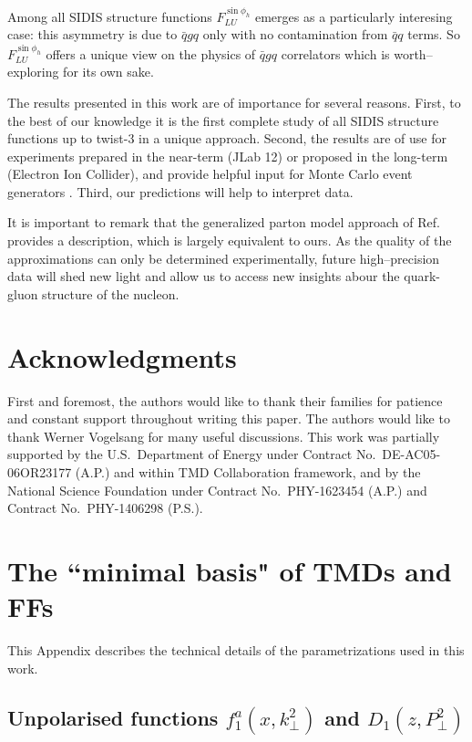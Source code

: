 \documentclass[a4paper,11pt]{article}
\begin{document}
Among all SIDIS structure functions $F_{LU}^{\sin\phi_h}$ emerges as
a particularly interesing case: this asymmetry is due to $\bar{q}gq$
only with no contamination from $\bar{q}q$ terms.
So $F_{LU}^{\sin\phi_h}$ offers a unique view on the physics of $\bar{q}gq$ 
correlators which is worth--exploring for its own sake.

The results presented in this work are of importance for several reasons.
First, to the best of our knowledge it is the first complete study 
of all SIDIS structure functions up to twist-3 in a unique approach. 
Second, the results are of use for experiments prepared in the near-term 
(JLab 12) or proposed in the long-term (Electron Ion Collider),
and provide helpful input for Monte Carlo event generators 
\cite{Avakian:2015vha}.
Third, our predictions will help to interpret data.

It is important to remark that the generalized parton model 
approach of Ref.~\cite{Anselmino:2011ch} provides a description,
which is largely equivalent to ours. As the quality of the 
approximations can only be determined experimentally, future
high--precision data will shed new light and allow us to 
access new insights abour the quark-gluon structure
of the nucleon.


\section{Acknowledgments}
First and foremost, the authors would like to thank their families 
for patience and constant support throughout writing this paper. 
The authors would like to thank Werner Vogelsang for many useful 
discussions. This work was partially supported by the U.S.\ 
Department of Energy under Contract No.~DE-AC05-06OR23177 (A.P.) 
and within TMD Collaboration framework, and by the National 
Science Foundation under Contract No.\ PHY-1623454 (A.P.)
and Contract No.\ PHY-1406298 (P.S.).


 
\newpage
\appendix

\section{\boldmath The ``minimal basis" of TMDs and FFs}
\label{App:basis}

This Appendix describes the technical details of the parametrizations
used in this work.

\subsection{\boldmath Unpolarised functions $f_1^a(x,k_\perp^2)$ 
			and $D_1(z,P_\perp^2)$}
\label{App:basis-f1-D1}
\end{document}
